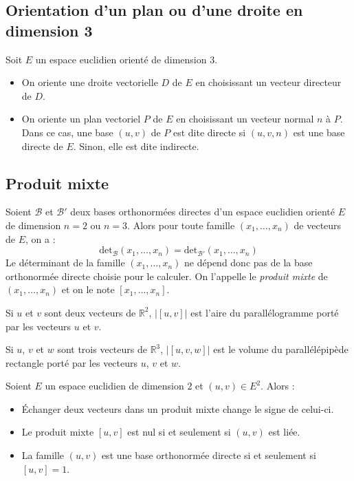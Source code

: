 \documentclass[a4paper,10pt]{report}
\begin{document}
\subsection{Orientation d'un plan ou d'une droite en dimension 3}
\noindent Soit $E$ un espace euclidien orienté de dimension $3$.
\begin{itemize}
\item On oriente une droite vectorielle $D$ de $E$ en choisissant un vecteur directeur de $D$.
\item On oriente un plan vectoriel $P$ de $E$ en choisissant un vecteur normal $n$ à $P$. Dans ce cas, une base $(u,v)$ de $P$ est dite directe si $(u,v,n)$ est une base directe de $E$. Sinon, elle est dite indirecte.
\end{itemize}

\subsection{Produit mixte}

\begin{defip} Soient $\mathcal{B}$ et $\mathcal{B}'$ deux bases orthonormées directes d'un espace euclidien orienté $E$ de dimension $n=2$ ou $n=3$. Alors pour toute famille $(x_1, \ldots, x_n)$ de vecteurs de $E$, on a :
$$ \textrm{det}_{\mathcal{B}}(x_1, \ldots, x_n) =  \textrm{det}_{\mathcal{B}'}(x_1, \ldots, x_n) $$
Le déterminant de la famille $(x_1, \ldots, x_n)$ ne dépend donc pas de la base orthonormée directe choisie pour le calculer. On l'appelle le \textit{produit mixte} de $(x_1, \ldots, x_n)$ et on le note $[x_1, \ldots, x_n]$.
\end{defip}

\begin{preuve}

\vspace{5cm}
\end{preuve}

\begin{rems}
\item Si $u$ et $v$ sont deux vecteurs de $\mathbb{R}^2$, $\vert [u,v]\vert$ est l'aire du parallélogramme porté par les vecteurs $u$ et $v$.
\item Si $u$, $v$ et $w$ sont trois vecteurs de $\mathbb{R}^3$, $\vert [u,v,w] \vert$ est le volume du parallélépipède rectangle porté par les vecteurs $u$, $v$ et $w$.
\end{rems}

\begin{prop} Soient $E$ un espace euclidien de dimension $2$ et $(u,v) \in E^2$. Alors :
\begin{itemize}
\item Échanger deux vecteurs dans un produit mixte change le signe de celui-ci.
\item Le produit mixte $[u,v]$ est nul si et seulement si $(u,v)$ est liée.
\item La famille $(u,v)$ est une base orthonormée directe si et seulement si $[u,v]=1$.
\end{itemize}
\end{prop}
\end{document}
